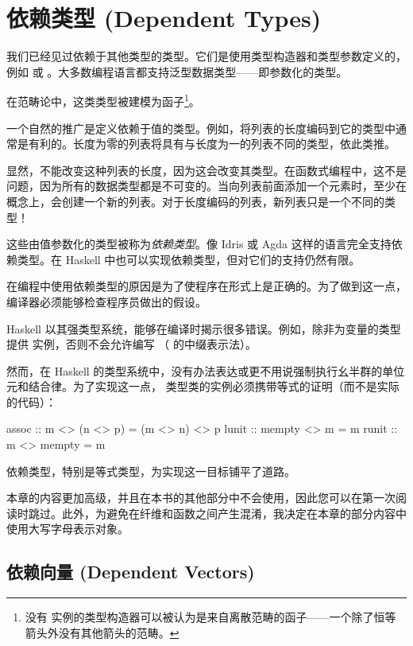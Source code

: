 \documentclass[DaoFP]{subfiles}
\begin{document}
 \setcounter{chapter}{10}

 \chapter{依赖类型 (Dependent Types)}

 我们已经见过依赖于其他类型的类型。它们是使用类型构造器和类型参数定义的，例如  或 \hask{[]}。大多数编程语言都支持泛型数据类型——即参数化的类型。

 在范畴论中，这类类型被建模为函子\footnote{没有  实例的类型构造器可以被认为是来自离散范畴的函子——一个除了恒等箭头外没有其他箭头的范畴。}。

 一个自然的推广是定义依赖于值的类型。例如，将列表的长度编码到它的类型中通常是有利的。长度为零的列表将具有与长度为一的列表不同的类型，依此类推。

 显然，不能改变这种列表的长度，因为这会改变其类型。在函数式编程中，这不是问题，因为所有的数据类型都是不可变的。当向列表前面添加一个元素时，至少在概念上，会创建一个新的列表。对于长度编码的列表，新列表只是一个不同的类型！

 这些由值参数化的类型被称为\emph{依赖类型}。像 Idris 或 Agda 这样的语言完全支持依赖类型。在 Haskell 中也可以实现依赖类型，但对它们的支持仍然有限。

 在编程中使用依赖类型的原因是为了使程序在形式上是正确的。为了做到这一点，编译器必须能够检查程序员做出的假设。

 Haskell 以其强类型系统，能够在编译时揭示很多错误。例如，除非为变量的类型提供  实例，否则不会允许编写 （ 的中缀表示法）。

 然而，在 Haskell 的类型系统中，没有办法表达或更不用说强制执行幺半群的单位元和结合律。为了实现这一点， 类型类的实例必须携带等式的证明（而不是实际的代码）：
 \begin{haskell}
  assoc :: m <> (n <> p) = (m <> n) <> p
  lunit :: mempty <> m = m
  runit :: m <> mempty = m
 \end{haskell}
 依赖类型，特别是等式类型，为实现这一目标铺平了道路。

 本章的内容更加高级，并且在本书的其他部分中不会使用，因此您可以在第一次阅读时跳过。此外，为避免在纤维和函数之间产生混淆，我决定在本章的部分内容中使用大写字母表示对象。

 \section{依赖向量 (Dependent Vectors)}
\end{document}
